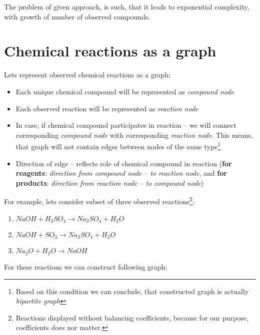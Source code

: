 \documentclass[10pt]{article}
\begin{document}
The problem of given approach, is such, that it leads to exponential complexity, with growth of number of observed compounds.

\newpage

\section{Chemical reactions as a graph}

Lets represent observed chemical reactions as a graph: 
\begin{itemize}
    \setlength \itemsep{0em}
    \item Each unique chemical compound will be represented as \emph{compound node}
    \item Each observed reaction will be represented as \emph{reaction node}
    \item In case, if chemical compound participates in reaction -- we will connect corresponding \emph{compound node} with corresponding \emph{reaction node}. This means, that graph will not contain edges between nodes of the same type\footnote{Based on this condition we can conclude, that constructed graph is actually \emph{bipartite graph}}
    \item Direction of edge -- reflects role of chemical compound in reaction (\textbf{for reagents}: \emph{direction from compound node -- to reaction node}, and \textbf{for products}: \emph{direction from reaction node -- to compound node})
\end{itemize}

\noindent For example, lets consider subset of three observed reactions\footnote{Reactions displayed without balancing coefficients, because for our purpose, coefficients does nor matter.}:

\begin{enumerate}
    \setlength \itemsep{0em}
    \item $NaOH + H_{2}SO_{4} \rightarrow Na_{2}SO_{4} + H_{2}O$
    \item $NaOH + SO_{3} \rightarrow Na_{2}SO_{4} + H_{2}O$
    \item $Na_{2}O + H_{2}O \rightarrow NaOH$
\end{enumerate}

\noindent For these reactions we can construct following graph:
\end{document}
